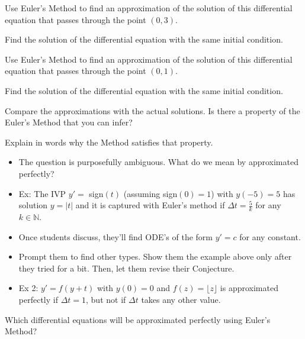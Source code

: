 \begin{parts}
	\item Use Euler's Method to find an approximation of the solution of this differential equation that passes through the point $(0,3)$.
	\item Find the solution of the differential equation with the same initial condition.

	\item Use Euler's Method to find an approximation of the solution of this differential equation that passes through the point $(0,1)$.
	\item Find the solution of the differential equation with the same initial condition.

	\item Compare the approximations with the actual solutions. Is there a property of the Euler's Method that you can infer?
	\item Explain in words why the Method satisfies that property.
	

\end{parts}




\bookonlynewpage



\begin{annotation}
	\begin{goals}
		\begin{itemize}
			\item The question is purposefully ambiguous.
				What do we mean by approximated perfectly?
		
			\item Ex: The IVP $y'=$ sign$(t)$ (assuming sign$(0)=1$) with $y(-5)=5$ has solution $y = |t|$ and it is captured with Euler's method if $\Delta t=\frac5k$ for any $k\in\mathbb{N}$. \\
		
			\item Once students discuss, they'll find ODE's of the form $y'= c$ for any constant. 
		
			\item Prompt them to find other types. Show them the example above only after they tried for a bit. 
				Then, let them revise their Conjecture.  \\
		
			\item Ex 2: $y'=f(y+t)$ with $y(0)=0$ and $f(z) = \lfloor z \rfloor$ is approximated perfectly if $\Delta t = 1$, but not if $\Delta t$ takes any other value.
		\end{itemize}
	\end{goals}
\end{annotation}
\question
	Which differential equations will be approximated perfectly using Euler's Method?








